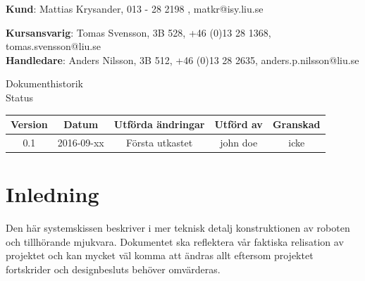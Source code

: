 \documentclass{article}
\begin{document}
\begin{center}
\textbf{Kund}: Mattias Krysander, 013 - 28 2198 , matkr@isy.liu.se
\end{center}

\begin{center}
\textbf{Kursansvarig}: Tomas Svensson, 3B 528, +46 (0)13 28 1368, tomas.svensson@liu.se \\
\textbf{Handledare}: Anders Nilsson, 3B 512, +46 (0)13 28 2635, anders.p.nilsson@liu.se
\end{center}
\vspace*{\fill}
\clearpage

\renewcommand*\contentsname{Innehållsförteckning}
\tableofcontents
\clearpage


{
\sffamily
\centering
\large


{\huge 
Dokumenthistorik \\
}
Status
\begin{center}
\begin{tabular}{ | c | c | c | c | c |} 
\hline
\textbf{Version} & \textbf{Datum} & \textbf{Utförda ändringar} & \textbf{Utförd av } & \textbf{Granskad} \\  
\hline
0.1 & 2016-09-xx & Första utkastet &  john doe & icke \\
\hline
\end{tabular}
\end{center}
}

\clearpage


\section{Inledning}
Den här systemskissen beskriver i mer teknisk detalj konstruktionen av roboten och tillhörande mjukvara. Dokumentet ska reflektera vår faktiska relisation av projektet och kan mycket väl komma att ändras allt eftersom projektet fortskrider och designbesluts behöver omvärderas.
\end{document}
